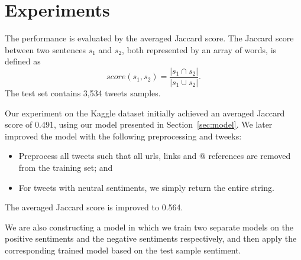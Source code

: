 \section{Experiments} \label{sec:experiment}

The performance is evaluated by the averaged Jaccard score. The Jaccard score between two sentences $s_1$ and $s_2$, both represented by an array of words, is defined as $$score(s_1, s_2) = \frac{|s_1 \cap s_2|}{|s_1 \cup s_2|}.$$ The test set contains 3,534 tweets samples.

Our experiment on the Kaggle dataset initially achieved an averaged Jaccard score of 0.491, using our model presented in Section~\ref{sec:model}. We later improved the model with the following preprocessing and tweeks:

\begin{itemize}
	\item Preprocess all tweets such that all urls, links and @ references are removed from the training set; and
	\item For tweets with neutral sentiments, we simply return the entire string.  
\end{itemize}

The averaged Jaccard score is improved to 0.564.
 
We are also constructing a model in which we train two separate models on the positive sentiments and the negative sentiments respectively, and then apply the corresponding trained model based on the test sample sentiment. 